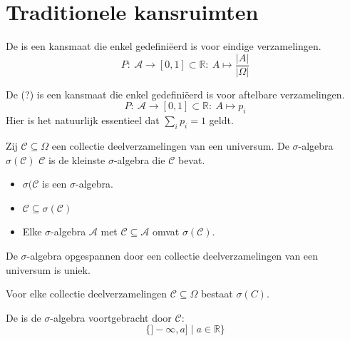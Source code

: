 \documentclass[main.tex]{subfiles}
\begin{document}
\section{Traditionele kansruimten}
\label{sec:trad-kansr}

\begin{de}
  De  is een kansmaat die enkel gedefini\"eerd is voor eindige verzamelingen.
  \[ P:\ \mathcal{A} \rightarrow [0,1] \subset \mathbb{R}:\ A \mapsto \frac{|A|}{|\Omega|} \]
\end{de}

\begin{de}
  De  (?) is een kansmaat die enkel gedefini\"eerd is voor aftelbare verzamelingen.
  \[ P:\ \mathcal{A} \rightarrow [0,1] \subset \mathbb{R}:\ A \mapsto p_{i} \]
  Hier is het natuurlijk essentieel dat $\sum_{i}p_{i}=1$ geldt. 
\end{de}

\begin{de}
  Zij $\mathcal{C} \subseteq \Omega$ een collectie deelverzamelingen van een universum.
  De $\sigma$-algebra $\sigma(\mathcal{C})$  $\mathcal{C}$ is de kleinste $\sigma$-algebra die $\mathcal{C}$ bevat.

  \begin{itemize}
  \item $\sigma(\mathcal{C}$ is een $\sigma$-algebra.
  \item $\mathcal{C} \subseteq \sigma(\mathcal{C})$
  \item Elke $\sigma$-algebra $\mathcal{A}$ met $\mathcal{C} \subseteq \mathcal{A}$ omvat $\sigma(\mathcal{C})$.
  \end{itemize}
\end{de}

\begin{st}
  De $\sigma$-algebra opgespannen door een collectie deelverzamelingen van een universum is uniek.
\end{st}

\begin{ei}
  Voor elke collectie deelverzamelingen $\mathcal{C} \subseteq \Omega$ bestaat $\sigma(C)$.
\end{ei}

\begin{de}
  De  is de $\sigma$-algebra voortgebracht door $\mathcal{C}$:
  \[ \{ ]-\infty,a] \mid a \in \mathbb{R} \} \]  
\end{de}
\end{document}
